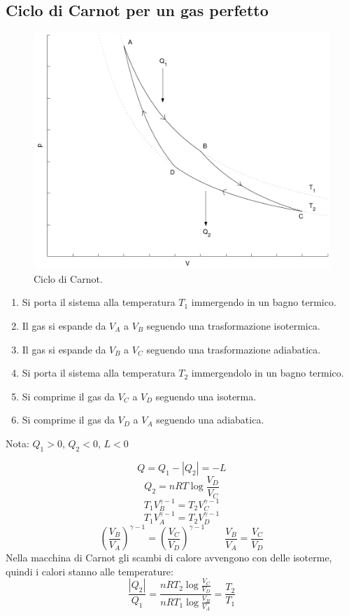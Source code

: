 \subsection{Ciclo di Carnot per un gas perfetto}
\begin{figure}[htbp]
\centering
\includegraphics[scale=0.5]{immagini/fisica1/Carnot}
\caption{Ciclo di Carnot.}
\end{figure}
\parbox[]{\textwidth}{
\begin{enumerate}
\item Si porta il sistema alla temperatura $T_1$ immergendo in un bagno termico.
\item Il gas si espande da $V_A$ a $V_B$ seguendo una trasformazione isotermica.
\item Il gas si espande da $V_B$ a $V_C$ seguendo una trasformazione adiabatica.
\item Si porta il sistema alla temperatura $T_2$ immergendolo in un bagno termico.
\item Si comprime il gas da $V_C$ a $V_D$ seguendo una isoterma.
\item Si comprime il gas da $V_D$ a $V_A$ seguendo una adiabatica.
\end{enumerate}}
Nota: $Q_1>0$, $Q_2<0$, $L<0$

\[Q=Q_1-|Q_2|=-L\]
\[Q_2=nRT\log\frac{V_D}{V_C}\]
\[T_1V_B^{\gamma-1}=T_2V_C^{\gamma-1}\]
\[T_1V_A^{\gamma-1}=T_2V_D^{\gamma-1}\]
\[\left(\frac{V_B}{V_A}\right)^{\gamma-1}=\left(\frac{V_C}{V_D}\right)^{\gamma-1}\qquad \frac{V_B}{V_A}=\frac{V_C}{V_D}\]
Nella macchina di Carnot gli scambi di calore avvengono con delle isoterme, quindi i calori stanno alle temperature:
\begin{equation}
 \frac{|Q_2|}{Q_1}=\frac{nRT_2\log\frac{V_C}{V_D}}{nRT_1\log\frac{V_B}{V_A}}=\frac{T_2}{T_1}
\end{equation}

